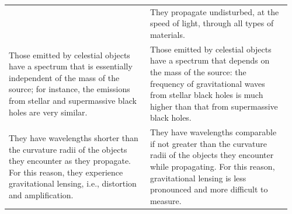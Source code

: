 {\begin{longtable}{@{}>{\raggedright\arraybackslash}p{0.48\linewidth}>{\raggedright\arraybackslash}p{0.48\linewidth}@{}}
&
They propagate undisturbed, at the speed of light, through all types of materials.
\\[6pt]
Those emitted by celestial objects have a spectrum\index{spectrum!electromagnetic} that is essentially independent of the mass of the source; for instance, the emissions from stellar and supermassive black holes are very similar.
&
Those emitted by celestial objects have a spectrum\index{spectrum!gravitational wave} that depends on the mass of the source: the frequency of gravitational waves from stellar black holes is much higher than that from supermassive black holes.
\\[6pt]
They have wavelengths shorter than the curvature radii of the objects they encounter as they propagate. For this reason, they experience gravitational lensing\index{gravitational!lensing}, i.e., distortion and amplification.
&
They have wavelengths comparable if not greater than the curvature radii of the objects they encounter while propagating. For this reason, gravitational lensing is less pronounced and more difficult to measure.
\\[6pt]
\bottomrule
\end{longtable}
}
